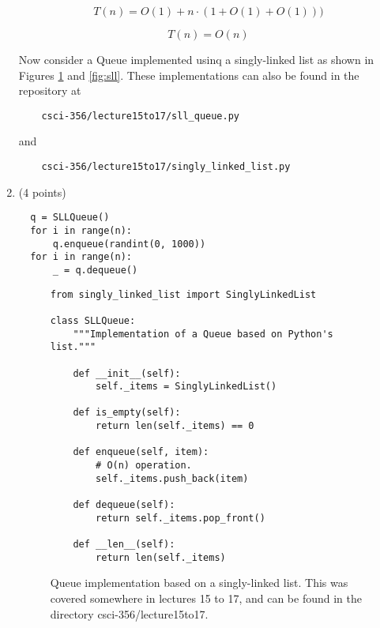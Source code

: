 \documentclass{article}
\begin{document}
\begin{enumerate}[label=(\alph*)]
\begin{equation*}
  T(n) = O(1) + n \cdot (1 + O(1) + O(1)))
\end{equation*}

\begin{equation*}
  \boxed{T(n) = O(n)}
\end{equation*}

\vspace{0.2in}

Now consider a Queue implemented usinq a singly-linked list as shown
in Figures \ref{fig:sll_queue} and \ref{fig:sll}.  These
implementations can also be found in the repository at

\begin{verbatim}
    csci-356/lecture15to17/sll_queue.py
\end{verbatim}

and

\begin{verbatim}
    csci-356/lecture15to17/singly_linked_list.py
\end{verbatim}

\item (4 points)
\begin{verbatim}
  q = SLLQueue()
  for i in range(n):
      q.enqueue(randint(0, 1000))
  for i in range(n):
      _ = q.dequeue()
\end{verbatim}

\begin{figure}
\begin{verbatim}
from singly_linked_list import SinglyLinkedList

class SLLQueue:
    """Implementation of a Queue based on Python's list."""

    def __init__(self):
        self._items = SinglyLinkedList()

    def is_empty(self):
        return len(self._items) == 0

    def enqueue(self, item):
        # O(n) operation.
        self._items.push_back(item)

    def dequeue(self):
        return self._items.pop_front()

    def __len__(self):
        return len(self._items)

\end{verbatim}

\caption{Queue implementation based on a singly-linked list.  This was
  covered somewhere in lectures 15 to 17, and can be found in the
  directory csci-356/lecture15to17.}\label{fig:sll_queue}
\end{figure}




\end{enumerate}
\end{document}
